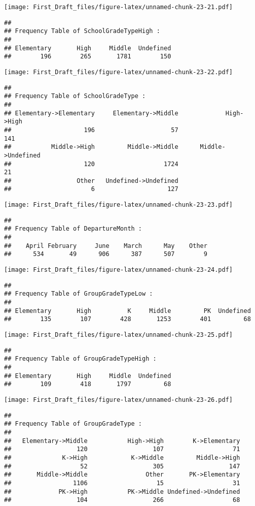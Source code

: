 \documentclass[
]{article}
\begin{document}
\texttt{[image: First\_Draft\_files/figure-latex/unnamed-chunk-23-21.pdf]}

\begin{verbatim}
## 
## Frequency Table of SchoolGradeTypeHigh :
## 
## Elementary       High     Middle  Undefined 
##        196        265       1781        150
\end{verbatim}

\texttt{[image: First\_Draft\_files/figure-latex/unnamed-chunk-23-22.pdf]}

\begin{verbatim}
## 
## Frequency Table of SchoolGradeType :
## 
## Elementary->Elementary     Elementary->Middle             High->High 
##                    196                     57                    141 
##           Middle->High         Middle->Middle      Middle->Undefined 
##                    120                   1724                     21 
##                  Other   Undefined->Undefined 
##                      6                    127
\end{verbatim}

\texttt{[image: First\_Draft\_files/figure-latex/unnamed-chunk-23-23.pdf]}

\begin{verbatim}
## 
## Frequency Table of DepartureMonth :
## 
##    April February     June    March      May    Other 
##      534       49      906      387      507        9
\end{verbatim}

\texttt{[image: First\_Draft\_files/figure-latex/unnamed-chunk-23-24.pdf]}

\begin{verbatim}
## 
## Frequency Table of GroupGradeTypeLow :
## 
## Elementary       High          K     Middle         PK  Undefined 
##        135        107        428       1253        401         68
\end{verbatim}

\texttt{[image: First\_Draft\_files/figure-latex/unnamed-chunk-23-25.pdf]}

\begin{verbatim}
## 
## Frequency Table of GroupGradeTypeHigh :
## 
## Elementary       High     Middle  Undefined 
##        109        418       1797         68
\end{verbatim}

\texttt{[image: First\_Draft\_files/figure-latex/unnamed-chunk-23-26.pdf]}

\begin{verbatim}
## 
## Frequency Table of GroupGradeType :
## 
##   Elementary->Middle           High->High        K->Elementary 
##                  120                  107                   71 
##              K->High            K->Middle         Middle->High 
##                   52                  305                  147 
##       Middle->Middle                Other       PK->Elementary 
##                 1106                   15                   31 
##             PK->High           PK->Middle Undefined->Undefined 
##                  104                  266                   68
\end{verbatim}
\end{document}
